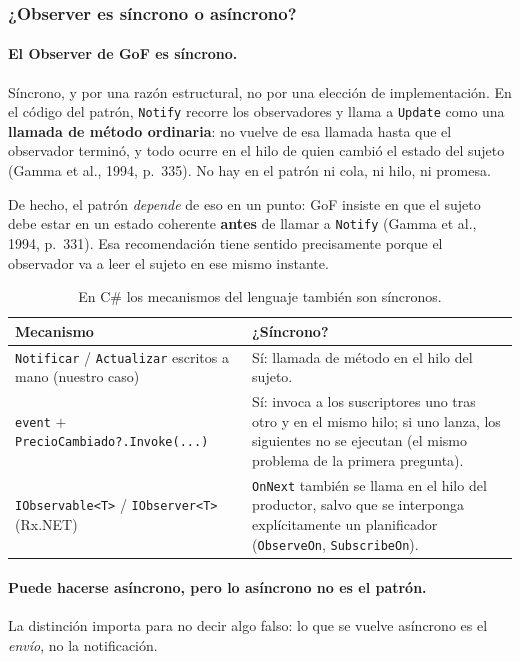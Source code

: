 \subsubsection{¿Observer es síncrono o asíncrono?}

\paragraph{El Observer de GoF es síncrono.}
Síncrono, y por una razón estructural, no por una elección de implementación. En el código
del patrón, \texttt{Notify} recorre los observadores y llama a \texttt{Update} como una
\textbf{llamada de método ordinaria}: no vuelve de esa llamada hasta que el observador
terminó, y todo ocurre en el hilo de quien cambió el estado del sujeto
(Gamma et al., 1994, p.~335). No hay en el patrón ni cola, ni hilo, ni promesa.

De hecho, el patrón \emph{depende} de eso en un punto: GoF insiste en que el sujeto debe
estar en un estado coherente \textbf{antes} de llamar a \texttt{Notify}
(Gamma et al., 1994, p.~331). Esa recomendación tiene sentido precisamente porque el
observador va a leer el sujeto en ese mismo instante.

\begin{table}[H]
\centering
\small
\begin{tabularx}{\textwidth}{>{\raggedright\arraybackslash}p{5.2cm} >{\raggedright\arraybackslash}X}
\toprule
\textbf{Mecanismo} & \textbf{¿Síncrono?} \\
\midrule
\texttt{Notificar} / \texttt{Actualizar} escritos a mano (nuestro caso) &
Sí: llamada de método en el hilo del sujeto. \\
\addlinespace
\texttt{event} $+$ \texttt{PrecioCambiado?.Invoke(...)} &
Sí: invoca a los suscriptores uno tras otro y en el mismo hilo; si uno lanza, los siguientes
no se ejecutan (el mismo problema de la primera pregunta). \\
\addlinespace
\texttt{IObservable<T>} / \texttt{IObserver<T>} (Rx.NET) &
\texttt{OnNext} también se llama en el hilo del productor, salvo que se interponga
explícitamente un planificador (\texttt{ObserveOn}, \texttt{SubscribeOn}). \\
\bottomrule
\end{tabularx}
\caption{En C\# los mecanismos del lenguaje también son síncronos.}
\end{table}

\paragraph{Puede hacerse asíncrono, pero lo asíncrono no es el patrón.}
La distinción importa para no decir algo falso: lo que se vuelve asíncrono es el
\emph{envío}, no la notificación.

